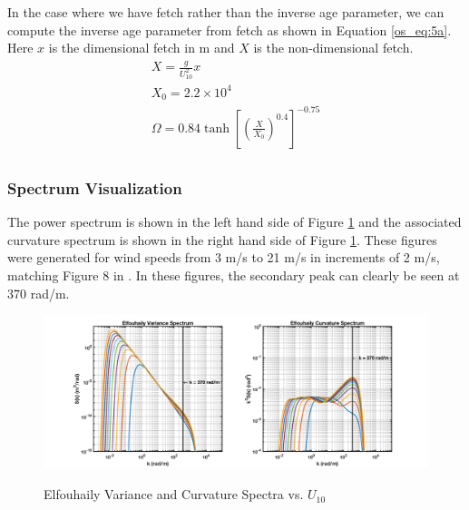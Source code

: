 In the case where we have fetch rather than the inverse age parameter, we can compute the inverse age parameter from fetch as shown in Equation \ref{os_eq:5a}. Here $x$ is the dimensional fetch in m and $X$ is the non-dimensional fetch.
\begin{equation}
\label{os_eq:5a}
\begin{gathered}
 X = \frac{g}{U_{10}^2}x\\
 X_0 = 2.2 \times 10^4 \\
 \Omega = 0.84\tanh\left[\left(\frac{X}{X_0} \right)^{0.4} \right]^{-0.75} \\
\end{gathered}
\end{equation}
\renewcommand{\baselinestretch}{2} \small\normalsize

\subsubsection{Spectrum Visualization}
The power spectrum is shown in the left hand side of Figure \ref{os_fig:3} and the associated curvature spectrum is shown in the right hand side of Figure \ref{os_fig:3}. These figures were generated for wind speeds from 3 m/s to 21 m/s in increments of 2 m/s, matching Figure 8 in \cite{elfouhaily}. In these figures, the secondary peak can clearly be seen at 370 rad/m.
\begin{figure}[H]
  \begin{center}
\includegraphics[width=6in]{../media/Ocean_Surface/elf_variance_curvature_spectrum.png}
  \end{center}
  \renewcommand{\baselinestretch}{1} \small\normalsize
  \begin{quote}
    \caption[Elfouhaily Variance and Curvature Spectra vs. $U_{10}$]{Elfouhaily Variance and Curvature Spectra vs. $U_{10}$\label{os_fig:3}}
  \end{quote}
\end{figure}
\renewcommand{\baselinestretch}{2} \small\normalsize


